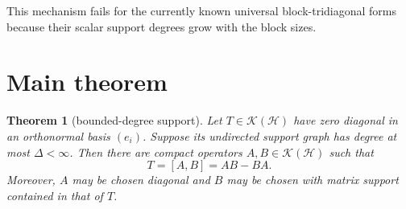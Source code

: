 \documentclass[11pt]{article}
\newtheorem{theorem}{Theorem}
\newcommand{\Hc}{\mathcal H}
\newcommand{\Kc}{\mathcal K}
\begin{document}
This mechanism fails for the currently known universal block-tridiagonal
forms because their scalar support degrees grow with the block sizes.

\section*{Main theorem}

\begin{theorem}[bounded-degree support]\label{thm:main}
Let $T\in\Kc(\Hc)$ have zero diagonal in an orthonormal basis $(e_i)$.
Suppose its undirected support graph has degree at most $\Delta<\infty$.
Then there are compact operators $A,B\in\Kc(\Hc)$ such that
\[
 T=[A,B]=AB-BA.
\]
Moreover, $A$ may be chosen diagonal and $B$ may be chosen with matrix
support contained in that of $T$.
\end{theorem}
\end{document}
